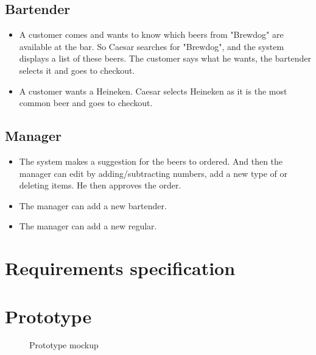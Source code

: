 \documentclass{article}
\begin{document}
\subsection{Bartender}

\begin{itemize}
\item A customer comes and wants to know which beers from "Brewdog" are available at the bar. So Caesar searches for "Brewdog", and the system displays a list of these beers. The customer says what he wants, the bartender selects it and goes to checkout.
\item A customer wants a Heineken. Caesar selects Heineken as it is the most common beer and goes to checkout.

\end{itemize}
\subsection{Manager}

\begin{itemize}
\item The system makes a suggestion for the beers to ordered. And then the manager can edit by adding/subtracting numbers, add a new type of or deleting items. He then approves the order.
\item The manager can add a new bartender.
\item The manager can add a new regular.

\end{itemize}
\section{Requirements specification}

\clearpage
\section{Prototype}
\begin{figure}[h!]
\centering
{}
\caption{Prototype mockup}
\label{fig:mockup}
\end{figure}
\end{document}
